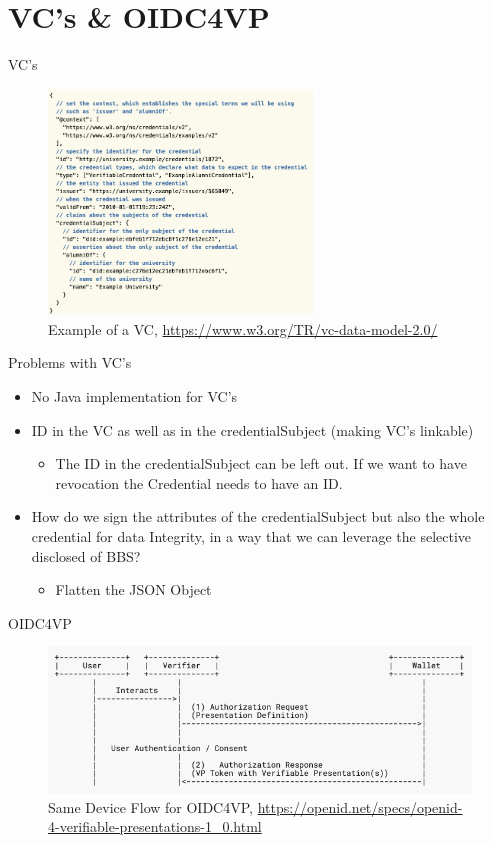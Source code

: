 \documentclass[
	english,%
	authorontitle=true,
	]{bfhbeamer}
\begin{document}
\section{VC's \& OIDC4VP}

\begin{frame}{VC's}
    \begin{figure}[h]
        \centering
        \includegraphics[width=70mm]{./img/VC_example.png}
        \caption{Example of a VC, \url{https://www.w3.org/TR/vc-data-model-2.0/}}
    \end{figure}
\end{frame}

\begin{frame}{Problems with VC's}
    \begin{itemize}
        \item No Java implementation for VC's
        \item ID in the VC as well as in the credentialSubject (making VC's linkable)
        \begin{itemize}
            \item The ID in the credentialSubject can be left out. If we want to have revocation the Credential needs to have an ID.
        \end{itemize}
        \item How do we sign the attributes of the credentialSubject but also the whole credential for data Integrity, in a way that we can leverage the selective disclosed of BBS?
        \begin{itemize}
            \item Flatten the JSON Object
        \end{itemize}
    \end{itemize}
\end{frame}

\begin{frame}{OIDC4VP}
    \begin{figure}[h]
        \centering
        \includegraphics[width=120mm]{./img/OIDC4VP.png}
        \caption{Same Device Flow for OIDC4VP, \url{https://openid.net/specs/openid-4-verifiable-presentations-1_0.html}}
    \end{figure}
\end{frame}
\end{document}
